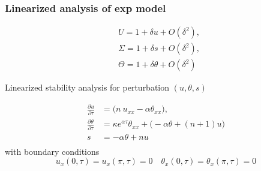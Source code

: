 \documentclass{beamer}
\def\red{\color{red}}
\def\del{\partial}
\begin{document}
% 
% 
% 
% 
\begin{frame}\frametitle{Linearized analysis of exp model}
{\small


\begin{equation*}
\begin{aligned}
  & U =  1 + \delta u + O(\delta^2) ,\\
  & \Sigma = 1 + \delta s + O(\delta^2),     \\
  & \Theta =  1 + \delta \theta  + O(\delta^2)
    \end{aligned}
\end{equation*}

\vspace{1cm} 

{\color{blue}Linearized stability analysis} for perturbation $(u, \theta, s)$


\begin{equation*}
\begin{aligned}
  \frac{\del u }{\del \tau}  &=  \Big ( n \ u_{ x x}  - \alpha \theta_{x x} \Big ) ,\\
  \frac{\del \theta }{\del \tau} &=\kappa e^{\alpha \tau} \theta_{xx}  +
   \Big ( -\alpha \theta + (n+1) u \Big )   \\
    s  & = -\alpha \theta + n u     \\
 \end{aligned}
\end{equation*}
with boundary conditions
$$
u_{x} (0,\tau) = u_{x} (\pi, \tau) = 0 \quad 
\theta_{x} (0,\tau) = \theta_{x} (\pi,\tau) = 0 
$$

}
\end{frame}
\end{document}
